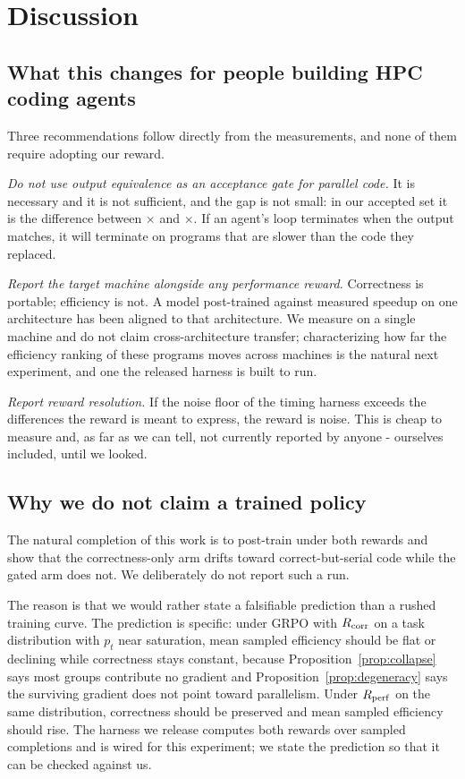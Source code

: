 \section{Discussion}
\label{sec:discussion}

\subsection{What this changes for people building HPC coding agents}

Three recommendations follow directly from the measurements, and none of them
require adopting our reward.

\emph{Do not use output equivalence as an acceptance gate for parallel code.}
It is necessary and it is not sufficient, and the gap is not small: in our
accepted set it is the difference between \SpeedMin$\times$ and
\SpeedMax$\times$. If an agent's loop terminates when the output matches, it
will terminate on programs that are slower than the code they replaced.

\emph{Report the target machine alongside any performance reward.} Correctness
is portable; efficiency is not. A model post-trained against measured speedup
on one architecture has been aligned to that architecture. We measure on a
single machine and do not claim cross-architecture transfer; characterizing how
far the efficiency ranking of these programs moves across machines is the
natural next experiment, and one the released harness is built to run.

\emph{Report reward resolution.} If the noise floor of the timing harness
exceeds the differences the reward is meant to express, the reward is noise.
This is cheap to measure and, as far as we can tell, not currently reported by
anyone - ourselves included, until we looked.

\subsection{Why we do not claim a trained policy}

The natural completion of this work is to post-train under both rewards and
show that the correctness-only arm drifts toward correct-but-serial code while
the gated arm does not. We deliberately do not report such a run.

The reason is that we would rather state a falsifiable prediction than a
rushed training curve. The prediction is specific: under GRPO with
$R_{\mathrm{corr}}$ on a task distribution with $p_t$ near saturation, mean sampled
efficiency should be flat or declining while correctness stays constant,
because Proposition~\ref{prop:collapse} says most groups contribute no
gradient and Proposition~\ref{prop:degeneracy} says the surviving gradient
does not point toward parallelism. Under $R_{\mathrm{perf}}$ on the same distribution,
correctness should be preserved and mean sampled efficiency should rise. The
harness we release computes both rewards over sampled completions and is
wired for this experiment; we state the prediction so that it can be checked
against us.

